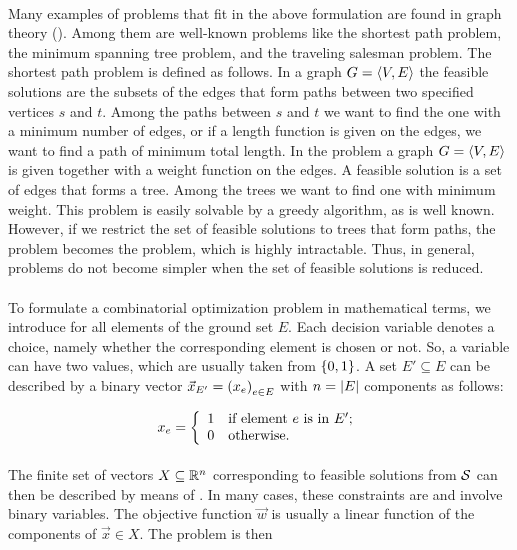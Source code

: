 \paragraph{}
Many examples of problems that fit in the above formulation are found in graph theory (). Among them are well-known problems like the shortest path problem, the minimum spanning tree problem, and the traveling salesman problem. The shortest path problem is defined as follows. In a graph $G=\left\langle V,E \right\rangle$ the feasible solutions are the subsets of the edges that form paths between two specified vertices $s$ and $t$. Among the paths between $s$ and $t$ we want to find the one with a minimum number of edges, or if a length function is given on the edges, we want to find a path of minimum total length. In the  problem a graph $G=\left\langle V,E \right\rangle$ is given together with a weight function on the edges. A feasible solution is a set of edges that forms a tree. Among the trees we want to find one with minimum weight. This problem is easily solvable by a greedy algorithm, as is well known. However, if we restrict the set of feasible solutions to trees that form paths, the problem becomes the  problem, which is highly intractable. Thus, in general, problems do not become simpler when the set of feasible solutions is reduced.

\paragraph{}
To formulate a combinatorial optimization problem in mathematical terms, we introduce  for all elements of the ground set $E$. Each decision variable denotes a choice, namely whether the corresponding element is chosen or not. So, a variable can have two values, which are usually taken from $\left\{ 0,1 \right\}$. A set $E'\subseteq E$ can be described by a binary vector $\vec{x}_{E'}=\left( x_e \right)_{e\in E}$ with $n=\left| E \right|$ components as follows:

\begin{equation}
x_e=\left\{\begin{array}{ll} 1&\mbox{if element $e$ is in $E'$;}\\0&\mbox{otherwise.} \end{array}\right.
\end{equation}

\paragraph{}
The finite set of vectors $X\subseteq\mathbb{R}^n$ corresponding to feasible solutions from $\mathcal{S}$ can then be described by means of . In many cases, these constraints are  and involve binary variables. The objective function $\vec{w}$ is usually a linear function of the components of $\vec{x}\in X$. The problem is then

